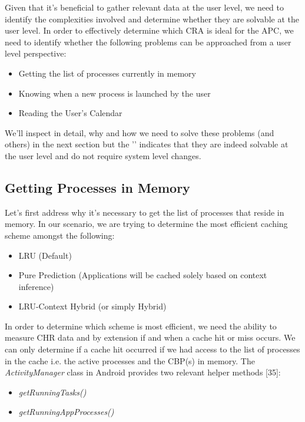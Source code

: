 \documentclass[12pt]{uthesis-v12}  %
\begin{document}
			Given that it's beneficial to gather relevant data at the user level, we need to identify the complexities involved and determine whether they are solvable at the user level. In order to effectively determine which CRA is ideal for the APC, we need to identify whether the following problems can be approached from a user level perspective:
			
			\begin{itemize}
				\item Getting the list of processes currently in memory \checkmark
				\item Knowing when a new process is launched by the user \checkmark
				\item Reading the User's Calendar \checkmark
			\end{itemize} 
			
			We'll inspect in detail, why and how we need to solve these problems (and others) in the next section but the  '\checkmark' indicates that they are indeed solvable at the user level and do not require system level changes.
			
		\subsection{Getting Processes in Memory}
			Let's first address why it's necessary to get the list of processes that reside in memory. In our scenario, we are trying to determine the most efficient caching scheme amongst the following:
			
			\begin{itemize}
				\item LRU (Default)
				\item Pure Prediction (Applications will be cached solely based on context inference)
				\item LRU-Context Hybrid (or simply Hybrid)
			\end{itemize}
			
			In order to determine which scheme is most efficient, we need the ability to measure CHR data and by extension if and when a cache hit or miss occurs. We can only determine if a cache hit occurred if we had access to the list of processes in the cache i.e. the active processes and the CBP(s) in memory. The {\em ActivityManager} class in Android provides two relevant helper methods [35]:
			
			\begin{itemize}
				\item {\em getRunningTasks()}
				\item {\em getRunningAppProcesses()}
			\end{itemize} 
			
\end{document}
